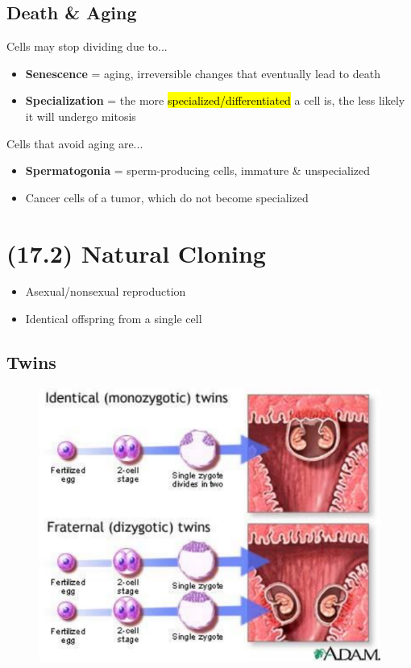 \documentclass[a4paper,12pt]{article}
\begin{document}
\subsection{Death \& Aging}\noindent

Cells may stop dividing due to...
\begin{itemize}
    \item{\textbf{Senescence} = aging, irreversible changes that eventually lead to death}
    \item{\textbf{Specialization} = the more \hl{specialized/differentiated} a cell is, the less likely it will undergo mitosis}
\end{itemize}

Cells that avoid aging are...
\begin{itemize}
    \item{\textbf{Spermatogonia} = sperm-producing cells, immature \& unspecialized}
    \item{Cancer cells of a tumor, which do not become specialized}
\end{itemize}

\pagebreak

\section{(17.2) Natural Cloning}
\begin{itemize}
    \item{Asexual/nonsexual reproduction}
    \item{Identical offspring from a single cell}
\end{itemize}

\subsection{Twins}
\begin{figure}[H]
    \centering
    \includegraphics[width=\textwidth]{twins}
\end{figure}
\end{document}
